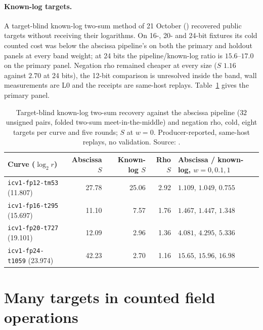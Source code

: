 \paragraph{Known-log targets.} A target-blind known-log two-sum method of
21 October () recovered
public targets without receiving their logarithms. On 16-, 20- and 24-bit
fixtures its cold counted cost was below the abscissa pipeline's on both
the primary and holdout panels at every band weight; at 24 bits the
pipeline/known-log ratio is $15.6$--$17.0$ on the primary panel. Negation
rho remained cheaper at every size ($S$ $1.16$ against $2.70$ at 24 bits),
the 12-bit comparison is unresolved inside the band, wall measurements are
L0 and the receipts are same-host replays. Table~\ref{tab:pg-knownlog} gives the
primary panel.

\begin{table}[t]
\centering\small
\begin{tabular}{@{}lrrrl@{}}
\toprule
Curve ($\log_2r$) & Abscissa $S$ & Known-log $S$ & Rho $S$ & Abscissa / known-log, $w=0,0.1,1$ \\
\midrule
\texttt{icv1-fp12-tm53} (11.807) & 27.78 & 25.06 & 2.92 & $1.109$, $1.049$, $0.755$ \\
\texttt{icv1-fp16-t295} (15.697) & 11.10 & 7.57 & 1.76 & $1.467$, $1.447$, $1.348$ \\
\texttt{icv1-fp20-t727} (19.101) & 12.09 & 2.96 & 1.36 & $4.081$, $4.295$, $5.336$ \\
\texttt{icv1-fp24-t1059} (23.974) & 42.23 & 2.70 & 1.16 & $15.65$, $15.96$, $16.98$ \\
\bottomrule
\end{tabular}
\caption[]{Target-blind known-log two-sum recovery against the abscissa
pipeline ($32$ unsigned pairs, folded two-sum meet-in-the-middle) and
negation rho, cold, eight targets per curve and five rounds; $S$ at $w=0$.
Producer-reported, same-host replays, no validation. Source:
.}
\label{tab:pg-knownlog}
\end{table}

\section{Many targets in counted field operations}\label{sec:pg-multitarget}

